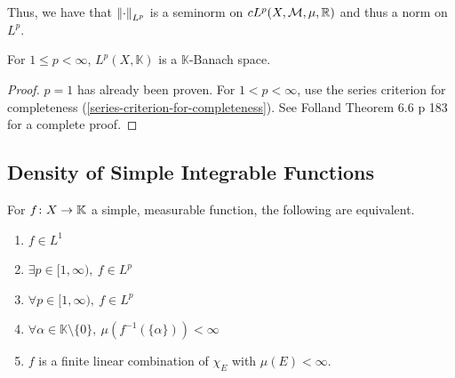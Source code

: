 \documentclass[11pt,leqno,oneside]{amsbook}
\numberwithin{thm}{section}
\newcommand{\M}{\mathcal{M}}
\newcommand{\K}{\mathbb{K}} %
\begin{document}
Thus, we have that \(\left\lVert\cdot\right\rVert_{L^p}\) is a seminorm on
\(cL^p(X,\M,\mu,\R)\) and thus a norm on \(L^p\).
\begin{thm}
  For \(1 \leq p < \infty\), \(L^p(X,\K)\) is a \(\K\)-Banach space.
\end{thm}
\begin{proof}
  \(p=1\) has already been proven. For \(1 < p < \infty\), use
  the series criterion for completeness
  (\ref{series-criterion-for-completeness}). See Folland Theorem 6.6 p
  183 for a complete proof.
\end{proof}
\subsection{Density of Simple Integrable Functions}
\begin{thm}
  For \(f \from X \to \K\) a simple, measurable function, the
  following are equivalent.
  \begin{enumerate}
  \item \(f \in L^1\)
  \item \(\exists p \in [1,\infty), \ f \in L^p\)
  \item \(\forall p \in [1,\infty), \ f \in L^p\)
  \item \(\forall \alpha \in \K \setminus \{0\}, \
    \mu(f^{-1}(\{\alpha\})) < \infty\)
  \item \(f\) is a finite linear combination of \(\chi_E\) with
    \(\mu(E) < \infty\).
  \end{enumerate}
\end{thm}
\end{document}
